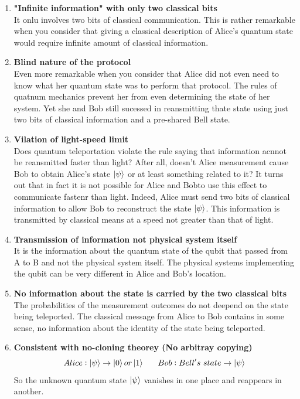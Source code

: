 \documentclass[]{article}
\theoremstyle{nonumberplain}
\begin{document}
\begin{enumerate}
	\item \textbf{"Infinite information" with only two classical bits \\}
			It onlu involves two bits of classical communication. This is rather remarkable when you consider that giving a classical description of Alice's quantum state would require infinite amount of classical information.
		\item \textbf{Blind nature of the protocol} \\
			Even more remarkable when you consider that Alice did not even need to know what her quantum state was to perform that protocol. The rules of quatnum mechanics prevent her from even determining the state of her system. Yet she and Bob still sucessed in reansmitting thate state using just two bits of classical information and a pre-shared Bell state.
		\item \textbf{Vilation of light-speed limit} \\
			Does quantum teleportation violate the rule saying that information acnnot be reansmitted faster than light? After all, doesn't Alice measurement cause Bob to obtain Alice's state $\ket{\psi}$ or at least something related to it? It turns out that in fact it is not possible for Alice and Bobto use this effect to communicate fastenr than light. Indeed, Alice must send two bits of classical information to allow Bob to reconstruct the state $\ket{\psi}$. This information is transmitted by classical means at a speed not greater than that of light.
		\item \textbf{Transmission of information not physical system itself} \\
			It is the information about the quantum state of the qubit that passed from A to B and not the physical system itself. The physical systems implementing the qubit can be very different in Alice and Bob's location.
		\item \textbf{No information about the state is carried by the two classical bits} \\
			The probabilities of the measurement outcomes do not deepend on the state being teleported. The classical message from Alice to Bob contains in some sense, no information about the identity of the state being teleported.
		\item \textbf{Consistent with no-cloning theorey (No arbitray copying)}
\[
	Alice: \ket{\psi} \rightarrow \ket{0} or \ket{1} \ \ \ \ \ Bob:Bell's\ state \rightarrow \ket{\psi}			
\] 
So the unknown quantum state $\ket{\psi}$ vanishes in one place and reappears in another.

\end{enumerate}
\end{document}
